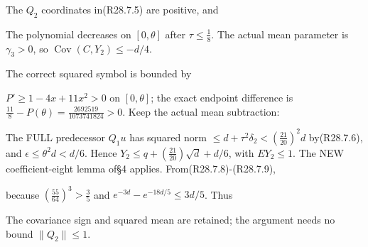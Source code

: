 
The \(Q_{2}\) coordinates in(R28.7.5) are positive, and


The polynomial decreases on \([0,\allowbreak \allowbreak \theta]\) after \(\tau\le \frac{1}{8}\). The actual mean parameter is \(\gamma_{3}>0\), so \(\operatorname{Cov}(C,\allowbreak \allowbreak Y_{2})\le -d/4\).

The correct squared symbol is bounded by


\(P'\ge 1-4x+11x^2>0\) on \([0,\allowbreak \allowbreak \theta]\); the exact endpoint difference is \(\frac{11}{8}-P(\theta)=\frac{2692519}{1073741824}>0\). Keep the actual mean subtraction:


The FULL predecessor \(Q_1 u\) has squared norm \(\le d+\tau^2\delta_2<(\frac{21}{20})^2d\) by(R28.7.6), and \(\epsilon\le \theta^2d<d/6\). Hence \(Y_{2}\le q+(\frac{21}{20})\sqrt{d}+d/6\), with \(EY_{2}\le 1\). The NEW coefficient-eight lemma of§4 applies. From(R28.7.8)-(R28.7.9),


because \((\frac{55}{64})^3>\frac{3}{5}\) and \(e^{-3d}-e^{-18d/5}\le 3d/5\). Thus


The covariance sign and squared mean are retained; the argument needs no bound \(\lVert Q_{2}\rVert \le 1\).

